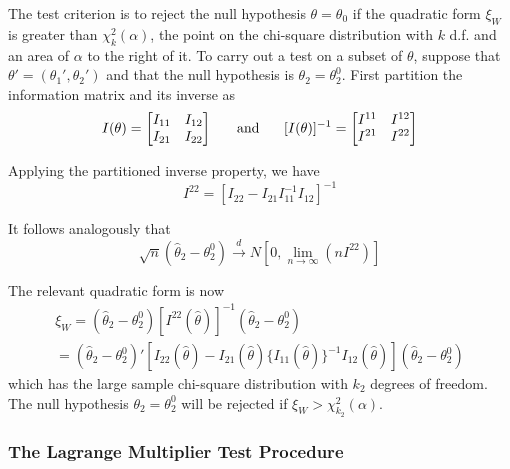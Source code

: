 \documentclass{article}
\begin{document}
The test criterion is to reject the null hypothesis \(\theta=\theta_0\) if the quadratic form \(\xi_W\) is greater than \(\chi_k^2(\alpha)\), the point on the chi-square distribution with \(k\) d.f. and an area of \(\alpha\) to the right of it. To carry out a test on a subset of \(\theta\), suppose that \(\theta'=(\theta_1',\theta_2')\) and that the null hypothesis is \(\theta_2=\theta_2^0\). First partition the information matrix and its inverse as
\begin{equation*}
    I(\theta) = \begin{bmatrix}
        I_{11} & I_{12} \\
        I_{21} & I_{22}
    \end{bmatrix}
    \hspace{0.5cm}
    \text{ and }
    \hspace{0.5cm}
    [I(\theta)]^{-1} = 
    \begin{bmatrix}
        I^{11} & I^{12} \\
        I^{21} & I^{22}
    \end{bmatrix}
\end{equation*}

Applying the partitioned inverse property, we have
\begin{equation*}
    I^{22}=[I_{22}-I_{21}I_{11}^{-1}I_{12}]^{-1}
\end{equation*}

It follows analogously that
\begin{equation*}
    \sqrt{n}(\hat{\theta}_2-\theta_2^0) \stackrel{d} \longrightarrow N\left[0,\lim_{n \rightarrow \infty} (n I^{22}) \right]
\end{equation*}

The relevant quadratic form is now
\begin{equation*}
    \begin{split}
        \xi_W=(\hat{\theta}_2-\theta_2^0)[I^{22}(\hat{\theta})]^{-1}(\hat{\theta}_2-\theta_2^0)\\
        = (\hat{\theta}_2-\theta_2^0)'[I_{22}(\hat{\theta})-I_{21}(\hat{\theta})\{I_{11}(\hat{\theta})\}^{-1}I_{12}(\hat{\theta})](\hat{\theta}_2-\theta_2^0)
    \end{split}
\end{equation*}
which has the large sample chi-square distribution with \(k_2\) degrees of freedom. The null hypothesis \(\theta_2=\theta_2^0\) will be rejected if \(\xi_W>\chi_{k_2}^2(\alpha)\).

\subsubsection{The Lagrange Multiplier Test Procedure}
\end{document}
